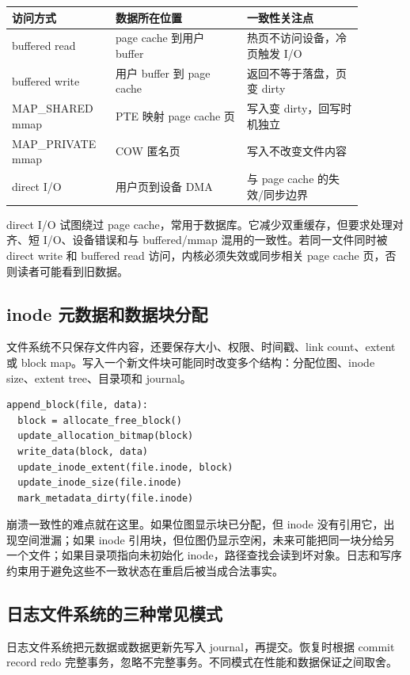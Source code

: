 \begin{longtable}{|p{0.24\linewidth}|p{0.34\linewidth}|p{0.3\linewidth}|}
\toprule
访问方式 & 数据所在位置 & 一致性关注点 \\
\midrule
buffered read & page cache 到用户 buffer & 热页不访问设备，冷页触发 I/O \\\tablerowrule
buffered write & 用户 buffer 到 page cache & 返回不等于落盘，页变 dirty \\\tablerowrule
MAP\_SHARED mmap & PTE 映射 page cache 页 & 写入变 dirty，回写时机独立 \\\tablerowrule
MAP\_PRIVATE mmap & COW 匿名页 & 写入不改变文件内容 \\\tablerowrule
direct I/O & 用户页到设备 DMA & 与 page cache 的失效/同步边界 \\
\bottomrule
\end{longtable}

direct I/O 试图绕过 page cache，常用于数据库。它减少双重缓存，但要求处理对齐、短 I/O、设备错误和与 buffered/mmap 混用的一致性。若同一文件同时被 direct write 和 buffered read 访问，内核必须失效或同步相关 page cache 页，否则读者可能看到旧数据。

\subsection{inode 元数据和数据块分配}

文件系统不只保存文件内容，还要保存大小、权限、时间戳、link count、extent 或 block map。写入一个新文件块可能同时改变多个结构：分配位图、inode size、extent tree、目录项和 journal。

\begin{lstlisting}
append_block(file, data):
  block = allocate_free_block()
  update_allocation_bitmap(block)
  write_data(block, data)
  update_inode_extent(file.inode, block)
  update_inode_size(file.inode)
  mark_metadata_dirty(file.inode)
\end{lstlisting}

崩溃一致性的难点就在这里。如果位图显示块已分配，但 inode 没有引用它，出现空间泄漏；如果 inode 引用块，但位图仍显示空闲，未来可能把同一块分给另一个文件；如果目录项指向未初始化 inode，路径查找会读到坏对象。日志和写序约束用于避免这些不一致状态在重启后被当成合法事实。

\subsection{日志文件系统的三种常见模式}

日志文件系统把元数据或数据更新先写入 journal，再提交。恢复时根据 commit record redo 完整事务，忽略不完整事务。不同模式在性能和数据保证之间取舍。

